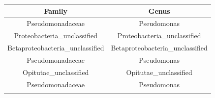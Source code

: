 \documentclass[]{article}
\begin{document}
\begin{longtable}[]{@{}cc@{}}
\toprule
\begin{minipage}[b]{0.44\columnwidth}\centering
Family\strut
\end{minipage} & \begin{minipage}[b]{0.46\columnwidth}\centering
Genus\strut
\end{minipage}\tabularnewline
\midrule
\endhead
\begin{minipage}[t]{0.44\columnwidth}\centering
Pseudomonadaceae\strut
\end{minipage} & \begin{minipage}[t]{0.46\columnwidth}\centering
Pseudomonas\strut
\end{minipage}\tabularnewline
\begin{minipage}[t]{0.44\columnwidth}\centering
Proteobacteria\_unclassified\strut
\end{minipage} & \begin{minipage}[t]{0.46\columnwidth}\centering
Proteobacteria\_unclassified\strut
\end{minipage}\tabularnewline
\begin{minipage}[t]{0.44\columnwidth}\centering
Betaproteobacteria\_unclassified\strut
\end{minipage} & \begin{minipage}[t]{0.46\columnwidth}\centering
Betaproteobacteria\_unclassified\strut
\end{minipage}\tabularnewline
\begin{minipage}[t]{0.44\columnwidth}\centering
Pseudomonadaceae\strut
\end{minipage} & \begin{minipage}[t]{0.46\columnwidth}\centering
Pseudomonas\strut
\end{minipage}\tabularnewline
\begin{minipage}[t]{0.44\columnwidth}\centering
Opitutae\_unclassified\strut
\end{minipage} & \begin{minipage}[t]{0.46\columnwidth}\centering
Opitutae\_unclassified\strut
\end{minipage}\tabularnewline
\begin{minipage}[t]{0.44\columnwidth}\centering
Pseudomonadaceae\strut
\end{minipage} & \begin{minipage}[t]{0.46\columnwidth}\centering
Pseudomonas\strut
\end{minipage}\tabularnewline
\begin{minipage}[t]{0.44\columnwidth}\centering

\end{minipage}
\end{longtable}
\end{document}
